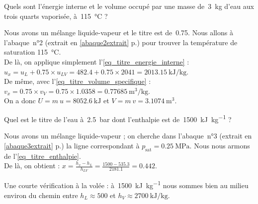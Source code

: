 			\begin{anexample}
			
			Quels sont l’énergie interne et le volume occupé par une masse de~\SI{3}{\kilogram} d’eau aux trois quarts vaporisée, à~\SI{115}{\degreeCelsius} ?
			
				\begin{answer}
				Nous avons un mélange liquide-vapeur et le titre est de~\num{0,75}. Nous allons à l’abaque~n°2 (extrait en \cref{abaque2extrait} p.\pageref{abaque2extrait}) pour trouver la température de saturation \SI{115}{\degreeCelsius}.\\
				De là, on applique simplement l’\cref{eq_titre_energie_interne} : $u_x = u_L + \num{0,75}\times u_{LV} = \num{482,4} + \num{0,75}\times\num{2041} = \SI{2013,15}{\kilo\joule\per\kilogram}$.\\
				De même, avec l’\cref{eq_titre_volume_specifique} : $v_x = \num{0,75}\times v_{V} = \num{0,75}\times\num{1,0358} = \SI{0,77685}{\metre\cubed\per\kilogram}$.\\				
				On a donc $U = m \ u = \SI{8052,6}{\kilo\joule} $ et $V = m \ v = \SI{3,1074}{\metre\cubed}$.
				\end{answer}
			\end{anexample}
		
			\begin{anexample}
			
			Quel est le titre de l’eau à~\SI{2,5}{\bar} dont l’enthalpie est de~\SI{1500}{\kilo\joule\per\kilogram} ?
			
				\begin{answer}
				Nous avons un mélange liquide-vapeur ; on cherche dans l’abaque~n°3 (extrait en \cref{abaque3extrait} p.\pageref{abaque3extrait}) la ligne correspondant à $p_\text{sat} = \SI{0,25}{\mega\pascal}$. Nous nous armons de l’\cref{eq_titre_enthalpie}.\\				
				De là, on obtient : $x = \frac{h_x - h_L}{h_{LV}} = \frac{\num{1500} - \num{535,3}}{\num{2181,1}} = \num{0,442} $.
				\begin{remark}Une courte vérification à la volée : à~\SI{1500}{\kilo\joule\per\kilogram} nous sommes bien au milieu environ du chemin entre $h_L \approx \num{500}$ et $h_V \approx \SI{2700}{\kilo\joule\per\kilogram}$. \end{remark}\end{answer}
			\end{anexample}




